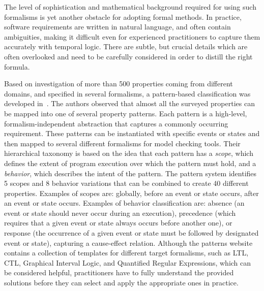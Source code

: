 \documentclass[letter]{llncs}
\begin{document}
The level of sophistication and mathematical background required for using such formalisms is yet another obstacle for adopting formal methods. 
In practice, software requirements are written in natural language, and often contain ambiguities, making it difficult even for experienced 
practitioners to capture them accurately with temporal logic. There are subtle, but crucial details which are often overlooked and 
need to be carefully considered in order to distill the right formula.

Based on investigation of more than 500 properties coming from different domains, and specified in several formalisms, a pattern-based classification
was developed in~\cite{Dwyer:1999:PPS:302405.302672}. The authors observed that almost all the surveyed properties
can be mapped into one of several property patterns. Each pattern is a
high-level, formalism-independent abstraction that captures a
commonly occurring requirement. These patterns can be instantiated with specific
events or states and then mapped to several different formalisms for model
checking tools. Their hierarchical taxonomy is based on the idea that each
pattern has a \emph{scope}, which defines the extent of program execution over
which the pattern must hold, and a \emph{behavior}, which describes the intent of the pattern. The pattern
system identifies 5 scopes and 8 behavior variations that can be
combined to create 40 different properties. Examples of scopes are: globally,
before an event or state occurs, after an event or state occurs.
Examples of behavior classification are: absence (an event or state should never
occur during an execution), precedence (which requires that a given event or
state always occurs before another one), 
or response (the occurrence of a given event or state must be followed by
designated event or state), capturing a cause-effect relation.
Although the patterns website~\cite{PSP} contains a collection of templates for
different target formalisms, such as LTL, CTL, Graphical Interval Logic,
and Quantified Regular Expressions, which can be considered helpful,
practitioners have to fully understand the provided solutions before they can
select and apply the appropriate ones in practice.
\end{document}
